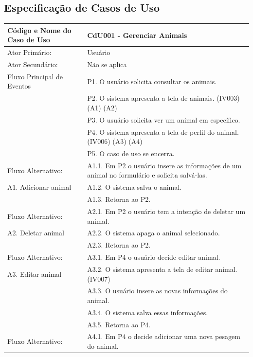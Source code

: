 \documentclass[12pt]{article}
\begin{document}
\begin{titlepage}
\subsection{Especificação de Casos de Uso}

\begin{center}
  \begin{tabular}{ | l |  p{10cm} |}
    \hline
    Código e Nome do Caso de Uso & CdU001 - Gerenciar Animais \\ \hline
    Ator Primário: & Usuário \\ 
    Ator Secundário: & Não se aplica \\ \hline
    Fluxo Principal de Eventos & P1. O usuário solicita consultar os animais. \\
                               & P2. O sistema apresenta a tela de animais. (IV003) (A1) (A2) \\
                               & P3. O usuário solicita ver um animal em específico. \\
			       & P4. O sistema apresenta a tela de perfil do animal. (IV006) (A3) (A4)  \\
                               & P5. O caso de uso se encerra. \\ \hline
    Fluxo Alternativo:         & A1.1. Em P2 o usuário insere as informações de um animal no formulário e solicita salvá-las. \\
    A1. Adicionar animal       & A1.2. O sistema salva o animal. \\ 
			       & A1.3. Retorna ao P2. \\ \hline
    Fluxo Alternativo:         & A2.1. Em P2 o usuário tem a intenção de deletar um animal. \\
    A2. Deletar animal         & A2.2. O sistema apaga o animal selecionado. \\
			       & A2.3. Retorna ao P2. \\ \hline
    Fluxo Alternativo:         & A3.1. Em P4 o usuário decide editar animal. \\
    A3. Editar animal          & A3.2. O sistema apresenta a tela de editar animal. (IV007) \\
			       & A3.3. O usuário insere as novas informações do animal. \\
                               & A3.4. O sistema salva essas informações. \\
			       & A3.5. Retorna ao P4. \\ \hline
    Fluxo Alternativo:         & A4.1. Em P4 o decide adicionar uma nova pesagem do animal. \\

\end{tabular}
\end{center}
\end{titlepage}
\end{document}
